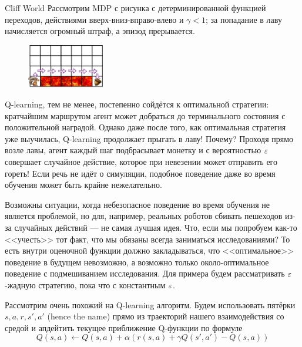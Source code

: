 \begin{exampleBox}[label=ex:cliffworld]{Cliff World}
Рассмотрим MDP с рисунка с детерминированной функцией переходов, действиями вверх-вниз-вправо-влево и $\gamma < 1$; за попадание в лаву начисляется огромный штраф, а эпизод прерывается.

\begin{figure}
\centering
\includegraphics[width=0.3\textwidth]{Images/SafeRL1.png}
\end{figure}
Q-learning, тем не менее, постепенно сойдётся к оптимальной стратегии: кратчайшим маршрутом агент может добраться до терминального состояния с положительной наградой. Однако даже после того, как оптимальная стратегия уже выучилась, Q-learning продолжает прыгать в лаву! Почему? Проходя прямо возле лавы, агент каждый шаг подбрасывает монетку и с вероятностью $\varepsilon$ совершает случайное действие, которое при невезении может отправить его гореть! Если речь не идёт о симуляции, подобное поведение даже во время обучения может быть крайне нежелательно.
\end{exampleBox}

Возможны ситуации, когда небезопасное поведение во время обучения не является проблемой, но для, например, реальных роботов сбивать пешеходов из-за случайных действий --- не самая лучшая идея. Что, если мы попробуем как-то <<учесть>> тот факт, что мы обязаны всегда заниматься исследованиями? То есть внутри оценочной функции должно закладываться, что <<оптимальное>> поведение в будущем невозможно, а возможно только около-оптимальное поведение с подмешиванием исследования. Для примера будем рассматривать $\varepsilon$-жадную стратегию, пока что с константным $\varepsilon$.

Рассмотрим очень похожий на Q-learning алгоритм. Будем использовать пятёрки $s, a, r, s', a'$ (hence the name) прямо из траекторий нашего взаимодействия со средой и апдейтить текущее приближение Q-функции по формуле
\begin{equation}\label{sarsa}
Q(s, a) \leftarrow Q(s, a) + \alpha \left( r(s, a) + \gamma Q(s', a') - Q(s, a) \right)
\end{equation}

